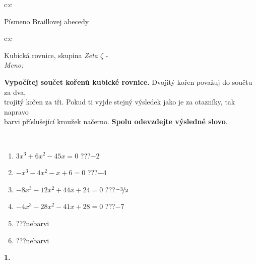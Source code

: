 \documentclass[10pt]{report}
\begin{document}
\begin{tabular}{c:c}
\begin{minipage}[c][104.5mm][t]{0.5\linewidth}
\begin{center}
\begin{minipage}{0.20\linewidth}
\begin{center}
{\small Písmeno Braillovej abecedy}
\end{center}
\end{minipage}
\end{center}
\end{minipage}
%
\end{tabular}
\newpage
\thispagestyle{empty}
\begin{tabular}{c:c}
\begin{minipage}[c][104.5mm][t]{0.5\linewidth}
\begin{center}
\vspace{7mm}
{\huge Kubická rovnice, skupina \textit{Zeta $\zeta$} -}\\[5mm]
\textit{Meno:}\phantom{xxxxxxxxxxxxxxxxxxxxxxxxxxxxxxxxxxxxxxxxxxxxxxxxxxxxxxxxxxxxxxxxx}\\[5mm]
\begin{minipage}{0.95\linewidth}
\textbf{Vypočítej součet kořenů kubické rovnice.} Dvojitý kořen považuj do součtu za dva,\\trojitý kořen za tři. Pokud ti vyjde stejný výsledek jako je za otazníky, tak napravo\\barvi příslušející kroužek načerno. \textbf{Spolu odevzdejte výsledné slovo}.
\end{minipage}
\\[1mm]
\begin{minipage}{0.79\linewidth}
\begin{center}
\begin{varwidth}{\linewidth}
\begin{enumerate}
\Large
\item $3x^3+6x^2-45x=0$\quad \dotfill\; ???\;\dotfill \quad $-2$
\item $-x^3-4x^2-x+6=0$\quad \dotfill\; ???\;\dotfill \quad $-4$
\item $-8x^3-12x^2+44x+24=0$\quad \dotfill\; ???\;\dotfill \quad $\nicefrac{-3}{2}$
\item $-4x^3-28x^2-41x+28=0$\quad \dotfill\; ???\;\dotfill \quad $-7$
\item \quad \dotfill\; ???\;\dotfill \quad nebarvi
\item \quad \dotfill\; ???\;\dotfill \quad nebarvi
\end{enumerate}
\end{varwidth}
\end{center}
\end{minipage}
\begin{minipage}{0.20\linewidth}
\begin{center}
{\Huge\bfseries 1.} \\[2mm]

\end{center}
\end{minipage}
\end{center}
\end{minipage}
\end{tabular}
\end{document}
